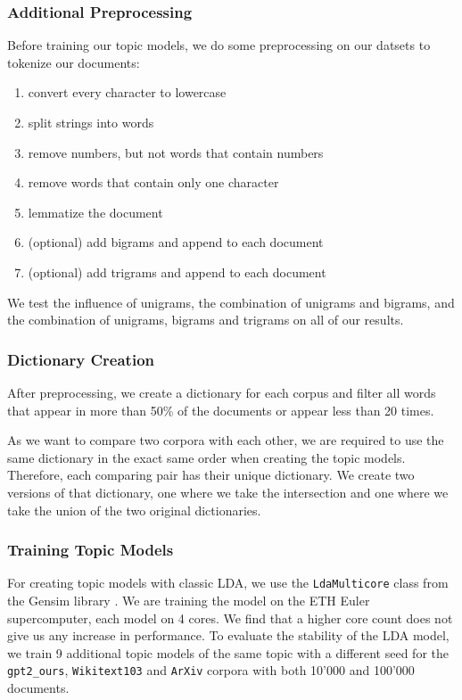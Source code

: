 \subsubsection{Additional Preprocessing}
Before training our topic models, we do some preprocessing on our datsets to tokenize our documents:
\begin{enumerate}
    \item convert every character to lowercase
    \item split strings into words
    \item remove numbers, but not words that contain numbers
    \item remove words that contain only one character
    \item lemmatize the document
    \item (optional) add bigrams and append to each document
    \item (optional) add trigrams and append to each document
\end{enumerate}
We test the influence of unigrams, the combination of unigrams and bigrams, and the combination of unigrams, bigrams and trigrams on all of our results. 

\subsubsection{Dictionary Creation} 
After preprocessing, we create a dictionary for each corpus and filter all words that appear in more than 50\% of the documents or appear less than 20 times. 

As we want to compare two corpora with each other, we are required to use the same dictionary in the exact same order when creating the topic models. Therefore, each comparing pair has their unique dictionary. We create two versions of that dictionary, one where we take the intersection and one where we take the union of the two original dictionaries.

\subsubsection{Training Topic Models}
For creating topic models with classic LDA, we use the \texttt{LdaMulticore} class from the Gensim library \cite{gensim}. We are training the model on the ETH Euler supercomputer, each model on 4 cores. We find that a higher core count does not give us any increase in performance. To evaluate the stability of the LDA model, we train 9 additional topic models of the same topic with a different seed for the \texttt{gpt2\_ours}, \texttt{Wikitext103} and \texttt{ArXiv} corpora with both 10'000 and 100'000 documents.

